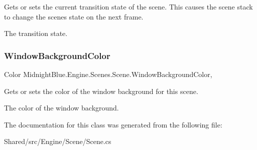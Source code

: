 Gets or sets the current transition state of the scene. This causes the scene stack to change the scenes state on the next frame. 

The transition state.\hypertarget{class_midnight_blue_1_1_engine_1_1_scenes_1_1_scene_abbf66efd894bdd76cc0f0f924591c62f}{}\label{class_midnight_blue_1_1_engine_1_1_scenes_1_1_scene_abbf66efd894bdd76cc0f0f924591c62f} 
\subsubsection{\texorpdfstring{Window\+Background\+Color}{WindowBackgroundColor}}
{\footnotesize\ttfamily Color Midnight\+Blue.\+Engine.\+Scenes.\+Scene.\+Window\+Background\+Color\hspace{0.3cm}{\ttfamily [get]}, {\ttfamily [set]}}



Gets or sets the color of the window background for this scene. 

The color of the window background.

The documentation for this class was generated from the following file\+:\begin{DoxyCompactItemize}
\item 
Shared/src/\+Engine/\+Scene/Scene.\+cs\end{DoxyCompactItemize}
